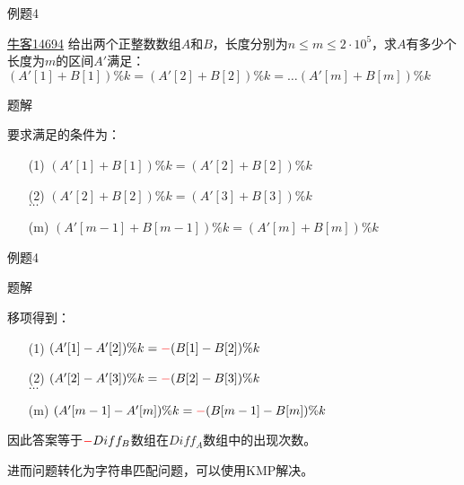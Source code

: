 \documentclass{ctexbeamer}		%
\begin{document}
\begin{frame}{例题4}
    
\begin{block}{\href{https://ac.nowcoder.com/acm/problem/14694}{牛客14694}}
给出两个正整数数组$A$和$B$，长度分别为$n\leq m \leq 2\cdot 10^5$，求$A$有多少个长度为$m$的区间$A'$满足：$(A'[1] + B[1])\% k = (A'[2] + B[2])\% k = \dots (A'[m] + B[m])\%k$
\end{block}    

\pause

\begin{block}{题解}

要求满足的条件为：
\begin{enumerate}
    \item [(1)]$(A'[1] + B[1]) \% k = (A'[2] + B[2]) \% k$
    \item [(2)]$(A'[2] + B[2]) \% k = (A'[3] + B[3]) \% k$ \\ $\dots$
    \item [(m)]$(A'[m-1] + B[m-1]) \% k = (A'[m] + B[m]) \% k$
\end{enumerate}

\end{block}

\end{frame}

\begin{frame}{例题4}
    
\begin{block}{题解}

移项得到：
\begin{enumerate}
    \item [(1)]$(A'[1] - A'[2]) \% k = {\color{red}-} (B[1] - B[2]) \% k$
    \item [(2)]$(A'[2] - A'[3]) \% k = {\color{red}-} (B[2] - B[3]) \% k$ \\ $\dots$
    \item [(m)]$(A'[m-1] - A'[m]) \% k = {\color{red}-} (B[m-1] - B[m]) \% k$
\end{enumerate}

\pause

\hphantom{}

因此答案等于${\color{red}-}Diff_B$数组在$Diff_A$数组中的出现次数。

进而问题转化为字符串匹配问题，可以使用KMP解决。

\end{block}

\end{frame}
\end{document}
